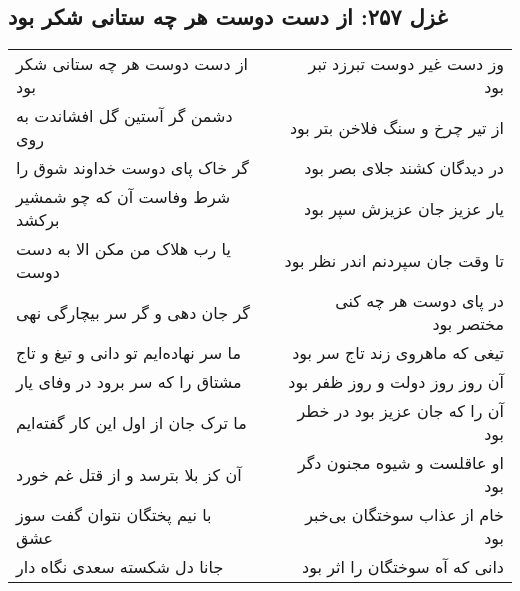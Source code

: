 \begin{center}
\section*{غزل ۲۵۷: از دست دوست هر چه ستانی شکر بود}
\label{sec:257}
\begin{longtable}{l p{0.5cm} r}
از دست دوست هر چه ستانی شکر بود
&&
وز دست غیر دوست تبرزد تبر بود
\\
دشمن گر آستین گل افشاندت به روی
&&
از تیر چرخ و سنگ فلاخن بتر بود
\\
گر خاک پای دوست خداوند شوق را
&&
در دیدگان کشند جلای بصر بود
\\
شرط وفاست آن که چو شمشیر برکشد
&&
یار عزیز جان عزیزش سپر بود
\\
یا رب هلاک من مکن الا به دست دوست
&&
تا وقت جان سپردنم اندر نظر بود
\\
گر جان دهی و گر سر بیچارگی نهی
&&
در پای دوست هر چه کنی مختصر بود
\\
ما سر نهاده‌ایم تو دانی و تیغ و تاج
&&
تیغی که ماهروی زند تاج سر بود
\\
مشتاق را که سر برود در وفای یار
&&
آن روز روز دولت و روز ظفر بود
\\
ما ترک جان از اول این کار گفته‌ایم
&&
آن را که جان عزیز بود در خطر بود
\\
آن کز بلا بترسد و از قتل غم خورد
&&
او عاقلست و شیوه مجنون دگر بود
\\
با نیم پختگان نتوان گفت سوز عشق
&&
خام از عذاب سوختگان بی‌خبر بود
\\
جانا دل شکسته سعدی نگاه دار
&&
دانی که آه سوختگان را اثر بود
\\
\end{longtable}
\end{center}
